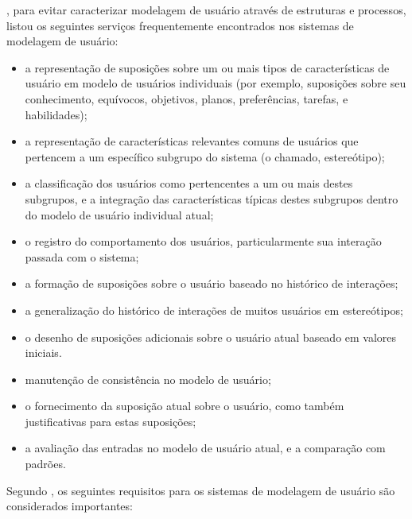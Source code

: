 \cite{Kobsa1994}, para evitar caracterizar modelagem de usuário através de estruturas e processos, listou os seguintes serviços frequentemente encontrados nos sistemas de modelagem de usuário:

\begin{itemize}
	\item{a representação de suposições sobre um ou mais tipos de características de usuário em modelo de usuários individuais (por exemplo, suposições sobre seu conhecimento, equívocos, objetivos, planos, preferências, tarefas, e habilidades);}
	
	\item{a representação de características relevantes comuns de usuários que pertencem a um específico subgrupo do sistema (o chamado, estereótipo);}
	
	\item{a classificação dos usuários como pertencentes a um ou mais destes subgrupos, e a integração das características típicas destes subgrupos dentro do modelo de usuário individual atual;}
	
	\item{o registro do comportamento dos usuários, particularmente sua interação passada com o sistema;}
	
	\item{a formação de suposições sobre o usuário baseado no histórico de interações;}
	
	\item{a generalização do histórico de interações de muitos usuários em estereótipos;}
	
	\item{o desenho de suposições adicionais sobre o usuário atual baseado em valores iniciais.}
	
	\item{manutenção de consistência no modelo de usuário;}
	
	\item{o fornecimento da suposição atual sobre o usuário, como também justificativas para estas suposições;}
	
	\item{a avaliação das entradas no modelo de usuário atual, e a comparação com padrões.}
\end{itemize}

Segundo \cite{Kobsa:2001:GUM:598284.598347}, os seguintes requisitos para os sistemas de modelagem de usuário são considerados importantes:

